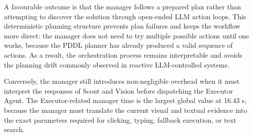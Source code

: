 \begin{table}[H]
\centering
{}
\caption{Autopilot average Manager Thinking timings (seconds) per task template, averaged across 3 runs each.}
\label{tab:manager_timings}
\end{table}

A favourable outcome is that the manager follows a prepared plan rather than attempting to discover the solution through open-ended LLM action loops. This deterministic planning structure prevents plan failures and keeps the workflow more direct: the manager does not need to try multiple possible actions until one works, because the PDDL planner has already produced a valid sequence of actions. As a result, the orchestration process remains interpretable and avoids the planning drift commonly observed in reactive LLM-controlled systems.

Conversely, the manager still introduces non-negligible overhead when it must interpret the responses of Scout and Vision before dispatching the Executor Agent. The Executor-related manager time is the largest global value at 16.43 s, because the manager must translate the current visual and textual evidence into the exact parameters required for clicking, typing, fallback execution, or text search.

